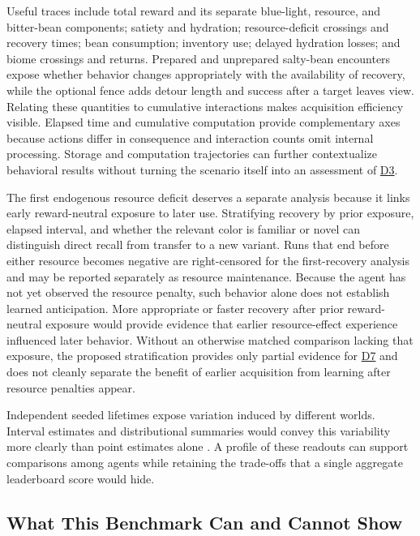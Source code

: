 \documentclass[10pt,journal,compsoc]{IEEEtran}
\DeclareRobustCommand{\Dref}[1]{\hyperref[sec:d#1]{D#1}}
\begin{document}
Useful traces include total reward and its separate blue-light, resource, and bitter-bean components; satiety and hydration; resource-deficit crossings and recovery times; bean consumption; inventory use; delayed hydration losses; and biome crossings and returns.
Prepared and unprepared salty-bean encounters expose whether behavior changes appropriately with the availability of recovery, while the optional fence adds detour length and success after a target leaves view.
Relating these quantities to cumulative interactions makes acquisition efficiency visible.
Elapsed time and cumulative computation provide complementary axes because actions differ in consequence and interaction counts omit internal processing.
Storage and computation trajectories can further contextualize behavioral results \cite{harun2023} without turning the scenario itself into an assessment of \Dref{3}.

The first endogenous resource deficit deserves a separate analysis because it links early reward-neutral exposure to later use.
Stratifying recovery by prior exposure, elapsed interval, and whether the relevant color is familiar or novel can distinguish direct recall from transfer to a new variant.
Runs that end before either resource becomes negative are right-censored for the first-recovery analysis and may be reported separately as resource maintenance.
Because the agent has not yet observed the resource penalty, such behavior alone does not establish learned anticipation.
More appropriate or faster recovery after prior reward-neutral exposure would provide evidence that earlier resource-effect experience influenced later behavior.
Without an otherwise matched comparison lacking that exposure, the proposed stratification provides only partial evidence for \Dref{7} and does not cleanly separate the benefit of earlier acquisition from learning after resource penalties appear.

Independent seeded lifetimes expose variation induced by different worlds.
Interval estimates and distributional summaries would convey this variability more clearly than point estimates alone \cite{agarwal2021,patterson2024}.
A profile of these readouts can support comparisons among agents while retaining the trade-offs that a single aggregate leaderboard score would hide.

\subsection{What This Benchmark Can and Cannot Show}
\end{document}
